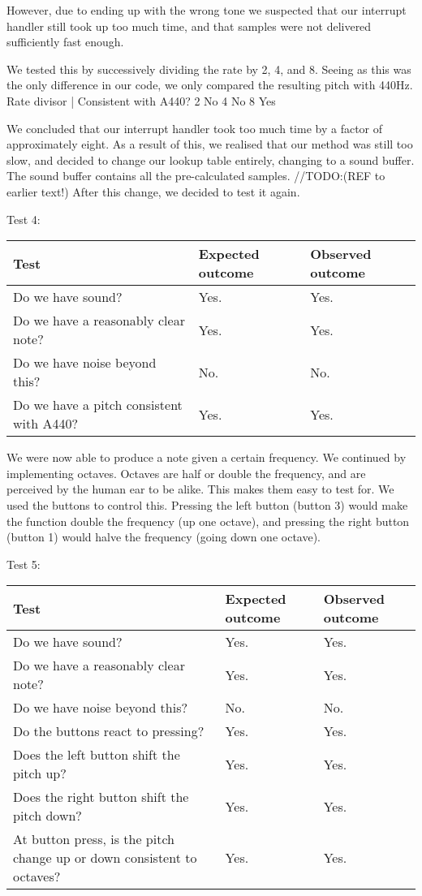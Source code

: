 However, due to ending up with the wrong tone we suspected that our interrupt handler still took up too much
time, and that samples were not delivered sufficiently fast enough.

We tested this by successively dividing the rate by 2, 4, and 8. Seeing as this was the only difference in our code, we only compared the resulting pitch with 440Hz.
Rate divisor  |	Consistent with A440?
2 				No
4				No
8				Yes

We concluded that our interrupt handler took too much time by a factor
of approximately eight. As a result of this, we realised that our method
was still too slow, and decided to change our lookup table entirely,
changing to a sound buffer. The sound buffer contains all the
pre-calculated samples. //TODO:(REF to earlier text!) After this change,
we decided to test it again.

Test 4:
\begin{center}
\begin{tabular}{|p{3.6cm}|p{3.6cm}|p{3.6cm}|}
\hline
{\sc Test} & {\sc Expected outcome} & {\sc Observed outcome}\\ \hline
Do we have sound? & Yes. & Yes. \\ \hline
Do we have a reasonably clear note? & Yes. & Yes. \\ \hline
Do we have noise beyond this? & No. & No. \\ \hline
Do we have a pitch consistent with A440? & Yes. & Yes. \\ \hline
\end{tabular}
\end{center}

We were now able to produce a note given a certain frequency. We
continued by implementing octaves. Octaves are half or double the
frequency, and are perceived by the human ear to be alike. This makes
them easy to test for. We used the buttons to control this. Pressing the
left button (button 3) would make the function double the frequency (up
one octave), and pressing the right button (button 1) would halve the
frequency (going down one octave).

Test 5:
\begin{center}
\begin{tabular}{|p{3.6cm}|p{3.6cm}|p{3.6cm}|}
\hline
{\sc Test} & {\sc Expected outcome} & {\sc Observed outcome}\\ \hline
Do we have sound? & Yes. & Yes. \\ \hline
Do we have a reasonably clear note? & Yes. & Yes. \\ \hline
Do we have noise beyond this? & No. & No. \\ \hline
Do the buttons react to pressing? & Yes. & Yes. \\ \hline
Does the left button shift the pitch up? & Yes. & Yes. \\ \hline
Does the right button shift the pitch down? & Yes. & Yes. \\ \hline
At button press, is the pitch change up or down consistent to octaves? &
Yes. & Yes. \\ \hline
\end{tabular}
\end{center}

